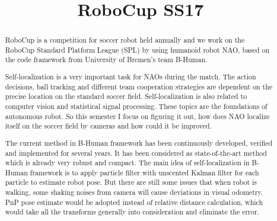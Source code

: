 \documentclass[ICS, PP, english, final]{ICS_thesis}
\begin{document}
\title{RoboCup SS17}


\maketitle



\phantom{u}
\begin{abstract}
RoboCup is a competition for soccer robot held annually and we work on the RoboCup Standard Platform League (SPL) by using humanoid robot NAO, based on the code framework from University of Bremen's team B-Human.

Self-localization is a very important task for NAOs during the match. The action decisions, ball tracking and different team cooperation strategies are dependent on the precise location on the standard soccer field. Self-localization is also related to computer vision and statistical signal processing. These topics are the foundations of autonomous robot. So this semester I focus on figuring it out, how does NAO localize itself on the soccer field by cameras and how could it be improved.

The current method in B-Human framework has been continuously developed, verified and implemented for several years. It has been considered as state-of-the-art method which is already very robust and compact. The main idea of self-localization in B-Human framework is to apply particle filter with unscented Kalman filter for each particle to estimate robot pose. But there are still some issues that when robot is walking, some shaking noises from camera will cause deviations in visual odometry. PnP pose estimate would be adopted instead of relative distance calculation, which would take all the transforms generally into consideration and eliminate the error.
\end{abstract}

\phantom{u}
\phantom{1}\vspace{6cm}
\begin{center}
\end{center}
\end{document}
